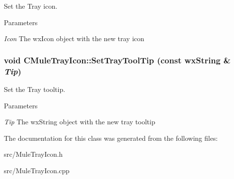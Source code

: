 Set the Tray icon. 
\begin{DoxyParams}{Parameters}
\item[{\em Icon}]The wxIcon object with the new tray icon \end{DoxyParams}
\subsubsection[{SetTrayToolTip}]{\setlength{\rightskip}{0pt plus 5cm}void CMuleTrayIcon::SetTrayToolTip (const wxString \& {\em Tip})}\label{classCMuleTrayIcon_af9764baf5b3347f3e970d0bcb5c756ed}


Set the Tray tooltip. 
\begin{DoxyParams}{Parameters}
\item[{\em Tip}]The wxString object with the new tray tooltip \end{DoxyParams}


The documentation for this class was generated from the following files:\begin{DoxyCompactItemize}
\item 
src/MuleTrayIcon.h\item 
src/MuleTrayIcon.cpp\end{DoxyCompactItemize}
